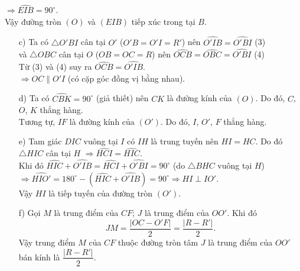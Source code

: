 \begin{bt}
{{	
		}
		$\Rightarrow \widehat{EIB}=90^\circ$.\\
		Vậy đường tròn $(O)$ và $(EIB)$ tiếp xúc trong tại $B$.
		\begin{enumerate}
			\item[c)] Ta có $\triangle O'BI$ cân tại $O'$ ($O'B=O'I=R'$) nên $\widehat{O'IB}=\widehat{O'BI}$ \hfill (3)\\
			và $\triangle OBC$ cân tại $O$ ($OB=OC=R$) nên $\widehat{OCB}=\widehat{OBC}=\widehat{O'BI}$ \hfill (4)\\
			Từ (3) và (4) suy ra $\widehat{OCB}=\widehat{O'IB}$.\\
			$\Rightarrow OC\parallel O'I$ (có cặp góc đồng vị bằng nhau).
			\item[d)] Ta có $\widehat{CBK}=90^\circ$ (giả thiết) nên $CK$ là đường kính của $(O)$. Do đó, $C$, $O$, $K$ thẳng hàng.\\
			Tương tự, $IF$ là đường kính của $(O')$. Do đó, $I$, $O'$, $F$ thẳng hàng.
			\item[e)] Tam giác $DIC$ vuông tại $I$ có $IH$ là trung tuyến nên $HI=HC$. Do đó $\triangle HIC$ cân tại $H$ $\Rightarrow \widehat{HCI}=\widehat{HIC}$.\\
			Khi đó $\widehat{HIC}+\widehat{O'IB}=\widehat{HCI} + \widehat{O'BI}=90^\circ$ (do $\triangle BHC$ vuông tại $H$)\\
			$\Rightarrow \widehat{HIO'}=180^\circ - (\widehat{HIC}+\widehat{O'IB})=90^\circ \Rightarrow HI\perp IO'$.\\
			Vậy $HI$ là tiếp tuyến của đường tròn $(O')$.
			\item [f)] Gọi $M$ là trung điểm của $CF$; $J$ là trung điểm của $OO'$. Khi đó
			$$JM=\dfrac{|OC-O'F|}{2}=\dfrac{|R-R'|}{2}.$$
			Vậy trung điểm $M$ của $CF$ thuộc đường tròn tâm $J$ là trung điểm của $OO'$ bán kính là $\dfrac{|R-R'|}{2}$.
		\end{enumerate}
	}
\end{bt}
